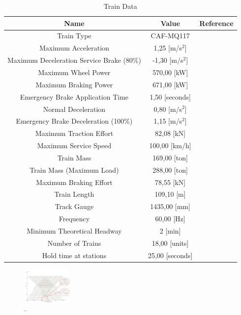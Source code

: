 \documentclass[conference]{IEEEtran}
\begin{document}
\begin{table}[ht]
\caption{Train Data}
\label{table:train_data}
\centering
\begin{tabular}{|c|c|c|}
\hline
\rowcolor[gray]{0.9}
Name & Value & Reference \\ 
\hline
Train Type & CAF-MQ117 & \cite{b10} \\
\hline
Maximum Acceleration & 1,25 [\scriptsize m/s$^2$]  & \cite{b11}  \\
\hline
Maximum Deceleration Service Brake \scriptsize(80\%)  & -1,30 [\scriptsize m/s$^2$] & \cite{b11} \\
\hline
Maximum Wheel Power  & 570,00 [\scriptsize kW] & \cite{b12} \\
\hline
Maximum Braking Power  & 671,00 [\scriptsize kW] & \cite{b12} \\
\hline
Emergency Brake Application Time  & 1,50 [\scriptsize seconds] & \cite{b11} \\
\hline
Normal Deceleration & 0,80 [\scriptsize m/s$^2$]  & \cite{b11} \\
\hline
Emergency Brake Deceleration \scriptsize(100\%) & 1,15 [\scriptsize m/s$^2$]  & \cite{b11} \\
\hline
Maximum Traction Effort  & 82,08 [\scriptsize kN] & \cite{b12} \\
\hline
Maximum Service Speed & 100,00 [\scriptsize km/h] & \cite{b11} \\
\hline
Train Mass & 169,00 [\scriptsize ton]& \cite{b11} \\
\hline
Train Mass (Maximum Load) & 288,00 [\scriptsize ton] & \cite{b11} \\
\hline
Maximum Braking Effort & 78,55 [\scriptsize kN] & \cite{b12} \\
\hline
Train Length & 109,10 [\scriptsize m] & \cite{b11} \\
\hline
Track Gauge & 1435,00 \scriptsize[mm] & \cite{b11} \\
\hline
Frequency  & 60,00 \scriptsize[Hz] & \cite{b13} \\
\hline
Minimum Theoretical Headway  & 2 [\scriptsize min]& \cite{b14} \\
\hline
Number of Trains  & 18,00 [\scriptsize units] & \cite{b14} \\
\hline
Hold time at stations & 25,00 [\scriptsize seconds] & \cite{b15} \\
\hline
\end{tabular}
\end{table}


\begin{figure}[ht]
    \centering
    \includegraphics[width=0.22\textwidth,scale=1]{Imagenes_general/SIM-8_TIME-25_HW-1_5_TRAINS-24.jpg}
    \caption{--}
    \label{fig:Simulation 8: 25 Trains / 1,5 mins headway}
\end{figure}
\end{document}
